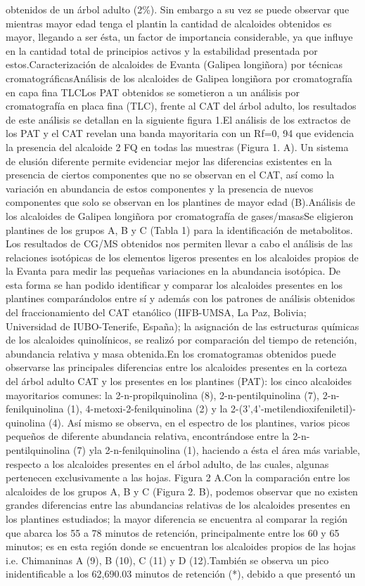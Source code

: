 \documentclass{article}
\begin{document}
obtenidos de un árbol adulto (2\%). Sin embargo a su vez se puede observar que mientras mayor edad tenga el plantin la cantidad de alcaloides obtenidos es mayor, llegando a ser ésta, un factor de importancia considerable, ya que influye en la cantidad total de principios activos y la estabilidad presentada por estos.Caracterización de alcaloides de Evanta (Galipea longiñora) por técnicas cromatográficasAnálisis de los alcaloides de Galipea longiñora por cromatografía en capa fina TLCLos PAT obtenidos se sometieron a un análisis por cromatografía en placa fina (TLC), frente al CAT del árbol adulto, los resultados de este análisis se detallan en la siguiente figura 1.El análisis de los extractos de los PAT y el CAT revelan una banda mayoritaria con un Rf=0, 94 que evidencia la presencia del alcaloide 2 FQ en todas las muestras (Figura 1. A). Un sistema de elusión diferente permite evidenciar mejor las diferencias existentes en la presencia de ciertos componentes que no se observan en el CAT, así como la variación en abundancia de estos componentes y la presencia de nuevos componentes que solo se observan en los plantines de mayor edad (B).Análisis de los alcaloides de Galipea longiñora por cromatografía de gases/masasSe eligieron plantines de los grupos A, B y C (Tabla 1) para la identificación de metabolitos. Los resultados de CG/MS obtenidos nos permiten llevar a cabo el análisis de las relaciones isotópicas de los elementos ligeros presentes en los alcaloides propios de la Evanta para medir las pequeñas variaciones en la abundancia isotópica. De esta forma se han podido identificar y comparar los alcaloides presentes en los plantines comparándolos entre sí y además con los patrones de análisis obtenidos del fraccionamiento del CAT etanólico (IIFB-UMSA, La Paz, Bolivia; Universidad de IUBO-Tenerife, España); la asignación de las estructuras químicas de los alcaloides quinolínicos, se realizó por comparación del tiempo de retención, abundancia relativa y masa obtenida.En los cromatogramas obtenidos puede observarse las principales diferencias entre los alcaloides presentes en la corteza del árbol adulto CAT y los presentes en los plantines (PAT): los cinco alcaloides mayoritarios comunes: la 2-n-propilquinolina (8), 2-n-pentilquinolina (7), 2-n-fenilquinolina (1), 4-metoxi-2-fenilquinolina (2) y la 2-(3',4'-metilendioxifeniletil)-quinolina (4). Así mismo se observa, en el espectro de los plantines, varios picos pequeños de diferente abundancia relativa, encontrándose entre la 2-n-pentilquinolina (7) yla 2-n-fenilquinolina (1), haciendo a ésta el área más variable, respecto a los alcaloides presentes en el árbol adulto, de las cuales, algunas pertenecen exclusivamente a las hojas. Figura 2 A.Con la comparación entre los alcaloides de los grupos A, B y C (Figura 2. B), podemos observar que no existen grandes diferencias entre las abundancias relativas de los alcaloides presentes en los plantines estudiados; la mayor diferencia se encuentra al comparar la región que abarca los 55 a 78 minutos de retención, principalmente entre los 60 y 65 minutos; es en esta región donde se encuentran los alcaloides propios de las hojas i.e. Chimaninas A (9), B (10), C (11) y D (12).También se observa un pico inidentificable a los 62,690.03 minutos de retención (*), debido a que presentó un 
\end{document}
